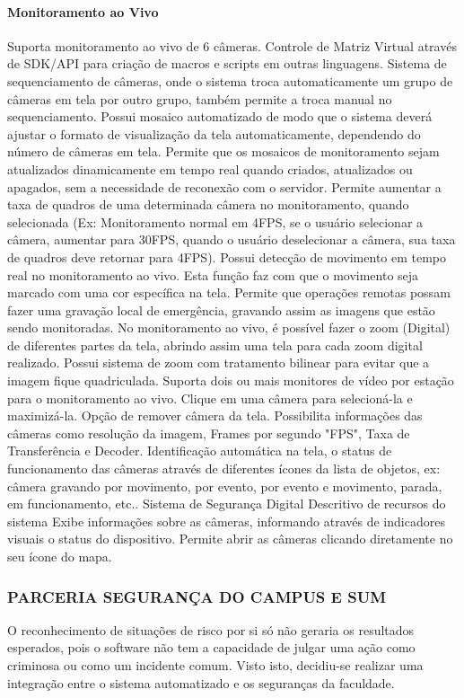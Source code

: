     \paragraph{Monitoramento ao Vivo}
    \bullet Suporta monitoramento ao vivo de 6 câmeras.
    \bullet Controle de Matriz Virtual através de SDK/API para criação de macros e scripts em outras linguagens.
    \bullet Sistema de sequenciamento de câmeras, onde o sistema troca automaticamente um grupo de câmeras em tela por outro grupo, também permite a troca manual no sequenciamento.
    \bullet Possui mosaico automatizado de modo que o sistema deverá ajustar o formato de visualização da tela automaticamente, dependendo do número de câmeras em tela.
    \bullet Permite que os mosaicos de monitoramento sejam atualizados dinamicamente em tempo real quando criados, atualizados ou apagados, sem a necessidade de reconexão com o servidor.
    \bullet Permite aumentar a taxa de quadros de uma determinada câmera no monitoramento, quando selecionada (Ex: Monitoramento normal em 4FPS, se o usuário selecionar a câmera, aumentar para 30FPS, quando o usuário deselecionar a câmera, sua taxa de quadros deve retornar para 4FPS).
    \bullet Possui detecção de movimento em tempo real no monitoramento ao vivo. Esta função faz com que o movimento seja marcado com uma cor específica na tela.
    \bullet Permite que operações remotas possam fazer uma gravação local de emergência, gravando assim as imagens que estão sendo monitoradas.
    \bullet No monitoramento ao vivo, é possível fazer o zoom (Digital) de diferentes partes da tela, abrindo assim uma tela para cada zoom digital realizado.
    \bullet Possui sistema de zoom com tratamento bilinear para evitar que a imagem fique quadriculada. Suporta dois ou mais monitores de vídeo por estação para o monitoramento ao vivo.
    \bullet Clique em uma câmera para selecioná-la e maximizá-la. Opção de remover câmera da tela. Possibilita informações das câmeras como resolução da imagem, Frames por segundo "FPS", Taxa de Transferência e Decoder.
    \bullet Identificação automática na tela, o status de funcionamento das câmeras através de diferentes ícones da lista de objetos, ex: câmera gravando por movimento, por evento, por evento e movimento, parada, em funcionamento, etc.. Sistema de Segurança Digital Descritivo de recursos do sistema
    \bullet Exibe informações sobre as câmeras, informando através de indicadores visuais o status do dispositivo.
    \bullet Permite abrir as câmeras clicando diretamente no seu ícone do mapa.

  \subsubsection{PARCERIA SEGURANÇA DO CAMPUS E SUM}
    O reconhecimento de situações de risco por si só não geraria os resultados esperados, pois o software não tem a capacidade de julgar uma ação como criminosa ou como um incidente comum. Visto isto, decidiu-se realizar uma integração entre o sistema automatizado e os seguranças da faculdade.
    
